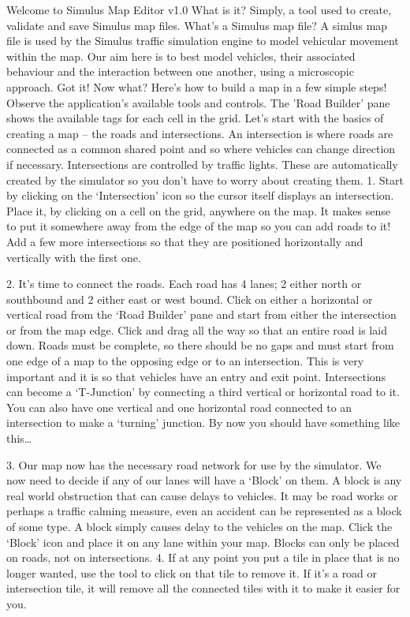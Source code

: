 \documentclass[12pt,a4paper]{article}
\begin{document}
Welcome to Simulus Map Editor v1.0
What is it?
Simply, a tool used to create, validate and save Simulus map files.  
What's a Simulus map file?
A simlus map file is used by the Simulus traffic simulation engine to model vehicular movement within the map.  Our aim here is to best model vehicles, their associated behaviour and the interaction between one another, using a microscopic approach. 
Got it!  Now what?
Here’s how to build a map in a few simple steps!  
Observe the application's available tools and controls.  The 'Road Builder' pane shows the available tags for each cell in the grid.  
Let’s start with the basics of creating a map – the roads and intersections.  An intersection is where roads are connected as a common shared point and so where vehicles can change direction if necessary.  Intersections are controlled by traffic lights.  These are automatically created by the simulator so you don’t have to worry about creating them. 
1.	Start by clicking on the ‘Intersection’ icon so the cursor itself displays an intersection.  Place it, by clicking on a cell on the grid, anywhere on the map.  It makes sense to put it somewhere away from the edge of the map so you can add roads to it!  Add a few more intersections so that they are positioned horizontally and vertically with the first one.

2.	It’s time to connect the roads.  Each road has 4 lanes; 2 either north or southbound and 2 either east or west bound.  Click on either a horizontal or vertical road from the ‘Road Builder’ pane and start from either the intersection or from the map edge.  Click and drag all the way so that an entire road is laid down.  Roads must be complete, so there should be no gaps and must start from one edge of a map to the opposing edge or to an intersection.  This is very important and it is so that vehicles have an entry and exit point.  Intersections can become a ‘T-Junction’ by connecting a third vertical or horizontal road to it.  You can also have one vertical and one horizontal road connected to an intersection to make a ‘turning’ junction.  By now you should have something like this…


 
3.	Our map now has the necessary road network for use by the simulator.  We now need to decide if any of our lanes will have a ‘Block’ on them.  A block is any real world obstruction that can cause delays to vehicles.  It may be road works or perhaps a traffic calming measure, even an accident can be represented as a block of some type.  A block simply causes delay to the vehicles on the map.  Click the ‘Block’ icon and place it on any lane within your map. Blocks can only be placed on roads, not on intersections.
4.	If at any point you put a tile in place that is no longer wanted, use the   tool to click on that tile to remove it.  If it’s a road or intersection tile, it will remove all the connected tiles with it to make it easier for you.
\end{document}
